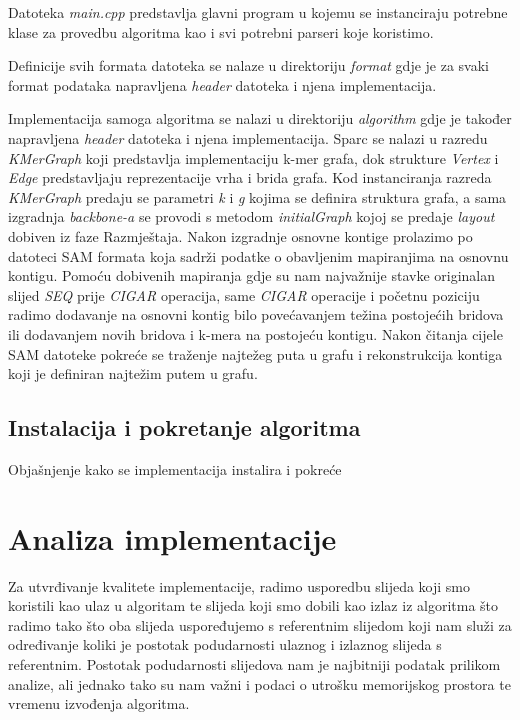 \documentclass[times, utf8, seminar, numeric]{fer}
\begin{document}
Datoteka \emph{main.cpp} predstavlja glavni program u kojemu se instanciraju potrebne klase za provedbu algoritma kao i svi potrebni parseri koje koristimo.

Definicije svih formata datoteka se nalaze u direktoriju \emph{format} gdje je za svaki format podataka napravljena \emph{header} datoteka i njena implementacija.

Implementacija samoga algoritma se nalazi u direktoriju \emph{algorithm} gdje je također napravljena \emph{header} datoteka i njena implementacija. Sparc se nalazi u razredu \emph{KMerGraph} koji predstavlja implementaciju k-mer grafa, dok strukture \emph{Vertex} i \emph{Edge} predstavljaju reprezentacije vrha i brida grafa. Kod instanciranja razreda \emph{KMerGraph} predaju se parametri \emph{k} i \emph{g} kojima se definira struktura grafa, a sama izgradnja \emph{backbone-a} se provodi s metodom \emph{initialGraph} kojoj se predaje \emph{layout} dobiven iz faze Razmještaja. Nakon izgradnje osnovne kontige prolazimo po datoteci SAM formata koja sadrži podatke o obavljenim mapiranjima na osnovnu kontigu. Pomoću dobivenih mapiranja gdje su nam najvažnije stavke originalan slijed \emph{SEQ} prije \emph{CIGAR} operacija, same \emph{CIGAR} operacije i početnu poziciju radimo dodavanje na osnovni kontig bilo povećavanjem težina postojećih bridova ili dodavanjem novih bridova i k-mera na postojeću kontigu. Nakon čitanja cijele SAM datoteke pokreće se traženje najtežeg puta u grafu i rekonstrukcija kontiga koji je definiran najtežim putem u grafu.

\section{Instalacija i pokretanje algoritma}
Objašnjenje kako se implementacija instalira i pokreće


\chapter{Analiza implementacije}
Za utvrđivanje kvalitete implementacije, radimo usporedbu slijeda koji smo koristili kao ulaz u algoritam te slijeda koji smo dobili kao izlaz iz algoritma što radimo tako što oba slijeda uspoređujemo s referentnim slijedom koji nam služi za određivanje koliki je postotak podudarnosti ulaznog i izlaznog slijeda s referentnim. Postotak podudarnosti slijedova nam je najbitniji podatak prilikom analize, ali jednako tako su nam važni i podaci o utrošku memorijskog prostora te vremenu izvođenja algoritma.
\end{document}

